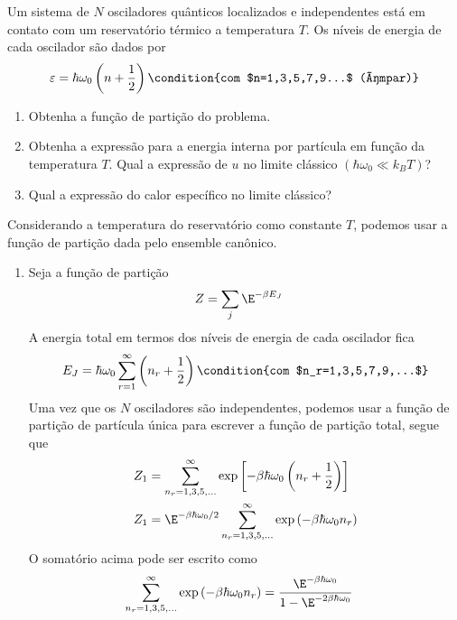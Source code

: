 \begin{prob}
  Um sistema de $N$ osciladores quânticos localizados e independentes está em contato com um reservatório térmico a temperatura $T$. Os níveis de energia de cada oscilador são dados por
  \begin{dmath*}
    \varepsilon=\hbar\omega_0\left(n+\frac{1}{2}\right) \condition{com $n=1,3,5,7,9...$ (ímpar)}
  \end{dmath*}
  \begin{enumerate}[label=\alph *)]
    \item Obtenha a função de partição do problema.
    \item Obtenha a expressão para a energia interna por partícula em função da temperatura $T$. Qual a expressão de $u$ no limite clássico $(\hbar\omega_0\ll k_BT)$?
    \item Qual a expressão do calor específico no limite clássico?
  \end{enumerate}
  \begin{sol}
    Considerando a temperatura do reservatório como constante $T$, podemos usar a função de partição dada pelo ensemble canônico.
    \begin{enumerate}[label=\alph *)]
      \item Seja a função de partição
      \begin{align}
        Z&=\sum_{j}\E^{-\beta E_J}
      \end{align}
      A energia total em termos dos níveis de energia de cada oscilador fica
      \begin{dmath*}
        E_J=\hbar\omega_0\sum_{r=1}^\infty\left(n_r+\frac{1}{2}\right) \condition{com $n_r=1,3,5,7,9,...$}
      \end{dmath*}
      Uma vez que os $N$ osciladores são independentes, podemos usar a função de partição de partícula única para escrever a função de partição total, segue que
      \begin{align}
        \begin{split}
          Z_1&=\sum_{n_r=1,3,5,...}^\infty\exp{\left[-\beta\hbar\omega_0\left(n_r+\frac{1}{2}\right)\right]}\\
          Z_1&=\E^{-\beta\hbar\omega_0/2}\sum_{n_r=1,3,5,...}^\infty\exp\left(-\beta\hbar\omega_0 n_r\right)
        \end{split}
      \end{align}
      O somatório acima pode ser escrito como
      \begin{align}
        \sum_{n_r=1,3,5,...}^\infty\exp\left(-\beta\hbar\omega_0 n_r\right)&=\frac{\E^{-\beta\hbar\omega_0}}{1-\E^{-2\beta\hbar\omega_0}}

\end{align}
\end{enumerate}
\end{sol}
\end{prob}
